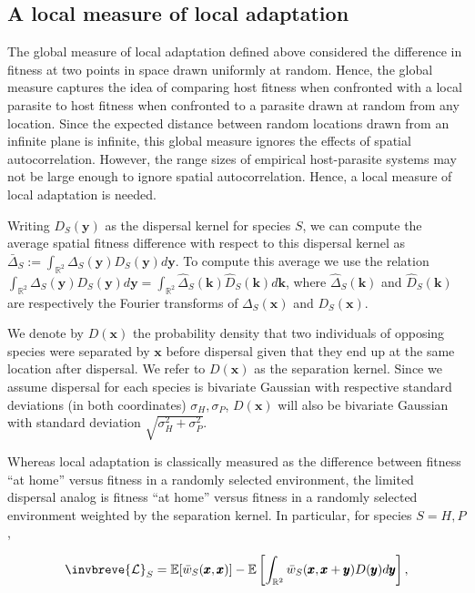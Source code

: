 \documentclass{article}
\begin{document}
\hypertarget{a-local-measure-of-local-adaptation}{%
\subsection{A local measure of local
adaptation}\label{a-local-measure-of-local-adaptation}}

The global measure of local adaptation defined above considered the
difference in fitness at two points in space drawn uniformly at random.
Hence, the global measure captures the idea of comparing host fitness
when confronted with a local parasite to host fitness when confronted to
a parasite drawn at random from any location. Since the expected
distance between random locations drawn from an infinite plane is
infinite, this global measure ignores the effects of spatial
autocorrelation. However, the range sizes of empirical host-parasite
systems may not be large enough to ignore spatial autocorrelation.
Hence, a local measure of local adaptation is needed.

Writing \(D_S(\pmb y)\) as the dispersal kernel for species \(S\), we
can compute the average spatial fitness difference with respect to this
dispersal kernel as
\(\bar\Delta_S:=\int_{\mathbb R^2}\Delta_S(\pmb y)D_S(\pmb y)d\pmb y\).
To compute this average we use the relation
\(\int_{\mathbb R^2}\Delta_S(\pmb y)D_S(\pmb y)d\pmb y=\int_{\mathbb R^2}\hat\Delta_S(\pmb k)\hat D_S(\pmb k)d\pmb k\),
where \(\hat\Delta_S(\pmb k)\) and \(\hat D_S(\pmb k)\) are respectively
the Fourier transforms of \(\Delta_S(\pmb x)\) and \(D_S(\pmb x)\).

We denote by \(D(\pmb x)\) the probability density that two individuals
of opposing species were separated by \(\pmb x\) before dispersal given
that they end up at the same location after dispersal. We refer to
\(D(\pmb x)\) as the separation kernel. Since we assume dispersal for
each species is bivariate Gaussian with respective standard deviations
(in both coordinates) \(\sigma_H,\sigma_P\), \(D(\pmb x)\) will also be
bivariate Gaussian with standard deviation
\(\sqrt{\sigma_H^2+\sigma_P^2}\).

Whereas local adaptation is classically measured as the difference
between fitness ``at home'' versus fitness in a randomly selected
environment, the limited dispersal analog is fitness ``at home'' versus
fitness in a randomly selected environment weighted by the separation
kernel. In particular, for species \(S=H,P\),

\[\invbreve{\mathcal L}_S=\mathbb E[\bar w_S(\pmb x,\pmb x)]-\mathbb E\left[\int_{\mathbb R^2}\bar w_S(\pmb x,\pmb x+\pmb y)D(\pmb y)d\pmb y\right],\]
\end{document}

